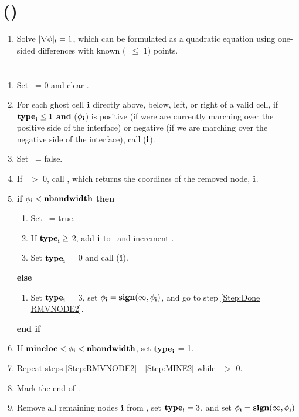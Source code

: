 \section{\EVAL(\ib)}
\begin{enumerate}
\item Solve $|\nabla\phi|_{{\bf i}}=1$, which can be formulated as a quadratic equation using one-sided differences with known (\type~$\le$ 1) points.
\end{enumerate}
\section{}
\begin{enumerate}
\item Set \numtent~= 0 and clear \heaploc.
\item For each ghost cell ${\bf i}$ directly above, below, left, or right of a valid cell, if ${\tt{\bf type}}_{{\bf i}} \le 1$  {\bf and} \sign($\phi_{\bf i}$) is positive (if were are currently marching over the positive side of the interface) or negative (if we are marching over the negative side of the interface), call (${\bf i}$).
\item Set \done~= false.
\item \label{Step:RMVNODE2} If \numtent~$>$ 0, call \RMVNODE, which returns the coordines of the removed node, ${\bf i}$.
\item {\bf if} $\phi_{\bf i} < {\tt{\bf nbandwidth}}$ {\bf then}
\begin{enumerate}
\item Set \done~= true.
\item If ${\tt{\bf type}}_{\bf i} \ge$ 2, add ${\bf i}$ to \nband~and increment \nbandnum.
\item Set ${\tt{\bf type}}_{\bf i}$ = 0 and call (${\bf i}$).
\end{enumerate}
{\bf else}
\begin{enumerate}
\item Set ${\tt{\bf type}}_{\bf i}$ = 3, set $\phi_{\bf i} = {\tt{\bf sign}}(\infty,\phi_{\bf i})$, and go to step \ref{Step:Done RMVNODE2}.
\end{enumerate}
{\bf end if}
\item \label{Step:MINE2} If ${\tt{\bf mineloc}} < \phi_{\bf i} < {\tt{\bf nbandwidth}}$, set ${\tt{\bf type}}_{\bf i}$ = 1.
\item Repeat steps \ref{Step:RMVNODE2} - \ref{Step:MINE2}  while \numtent~$>$ 0.
\item \label{Step:Done RMVNODE2} Mark the end of \nband.
\item Remove all remaining nodes ${\bf i}$ from \heap, set ${\tt{\bf type}}_{\bf i} = 3$, and set $\phi_{\bf i} = {\tt{\bf sign}}(\infty,\phi_{\bf i})$
\end{enumerate}
